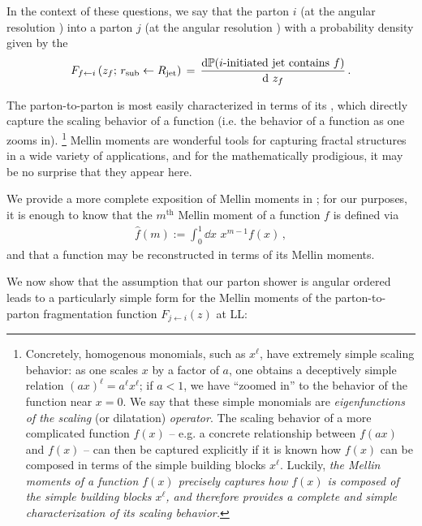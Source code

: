 In the context of these questions, we say that the parton \(i\) (at the angular resolution \Rjet)  into a parton \(j\) (at the angular resolution \rsub) with a probability density given by the 
\begin{align}
    \label{eq:fragmentation_function}
    F_{f \leftarrow i}
    \le(z_f; \, \rsub \leftarrow \Rjet\ri)
    \,
    =
    \,
    \frac{\dd\mathbb{P}(i\text{-initiated jet contains }f)}{\dd  \,\,z_f}
    \,.
\end{align}




The \gls{parton-to-parton} is most easily characterized in terms of its , which directly capture the scaling behavior of a function (i.e. the behavior of a function as one zooms in).%
\footnote{
    Concretely, homogenous monomials, such as \(x^\ell\), have extremely simple scaling behavior:
    as one scales \(x\) by a factor of \(a\), one obtains a deceptively simple relation \((a x)^\ell = a^\ell x^\ell\);
    if \(a < 1\), we have ``zoomed in'' to the behavior of the function near \(x = 0\).
    We say that these simple monomials are \textit{eigenfunctions of the scaling} (or dilatation) \textit{operator}.
    The scaling behavior of a more complicated function \(f(x)\) -- e.g. a concrete relationship between \(f(ax)\) and \(f(x)\) -- can then be captured explicitly if it is known how \(f(x)\) can be composed in terms of the simple building blocks \(x^\ell\).
    Luckily, \textit{the Mellin moments of a function \(f(x)\) precisely captures how \(f(x)\) is composed of the simple building blocks \(x^\ell\), and therefore provides a complete and simple characterization of its scaling behavior.}
}
%
Mellin moments are wonderful tools for capturing fractal structures in a wide variety of applications, and for the mathematically prodigious, it may be no surprise that they appear here.


We provide a more complete exposition of Mellin moments in ;
%
for our purposes, it is enough to know that the \(m^\text{th}\) Mellin moment of a function \(f\) is defined via
\begin{align}
    \hat{f}(m) := \int_0^1 \dd x \,\, x^{m-1} f(x)
    \,,
\end{align}
and that a function may be reconstructed in terms of its Mellin moments.

We now show that the assumption that our parton shower is angular ordered leads to a particularly simple form for the Mellin moments of the parton-to-parton fragmentation function \(F_{j \leftarrow i}(z)\) at LL:

